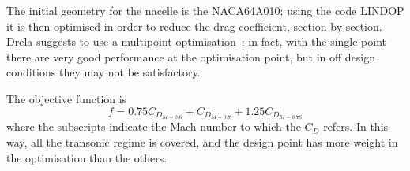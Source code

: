 The initial geometry for the nacelle is the NACA64A010; using the code LINDOP it is then optimised in order to reduce the drag coefficient, section by section. 
Drela suggests to use a multipoint optimisation~\cite{bib:drela_1993}: in fact, with the single point there are very good performance at the optimisation point, but in off design conditions they may not be satisfactory. 

The objective function is
\begin{equation}
	\label{eq:mses_multipoint_obj}
	f = 0.75 C_{D_{M=0.6}} + C_{D_{M=0.7}} + 1.25 C_{D_{M=0.78}}
\end{equation}
where the subscripts indicate the Mach number to which the $C_D$ refers. 
In this way, all the transonic regime is covered, and the design point has more weight in the optimisation than the others. 

